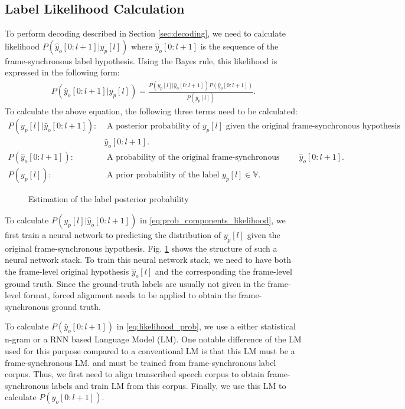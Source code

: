 \documentclass{article}
\begin{document}
\subsection{Label Likelihood Calculation}
To perform decoding described in Section \ref{sec:decoding}, 
we need to calculate likelihood $P(\hat{y}_o[0:l+1] | y_p[l])$
where $\hat{y}_o[0:l+1]$ is the sequence of the frame-synchronous 
label hypothesis.
Using the Bayes rule, this likelihood is expressed in the following form:
\begin{align}
  P(\hat{y}_o[0:l+1] \big| y_p[l]) 
    = \frac{P(y_p[l] \big| \hat{y}_o[0:l+1])
        P\left(\hat{y}_o[0:l+1] \right)}{P(y_p[l])}.
  \label{eq:likelihood_prob}
\end{align}
To calculate the above equation, the following three terms need to be
calculated:
\begin{align}
  P(y_p[l] \big| \hat{y}_o[0:l+1]): & \text{ A posterior probability of } y_p[l]
    \text{ given the original frame-synchronous hypothesis } \nonumber \\ 
    & \hat{y}_o[0:l+1].
    \nonumber \\
  P\left(\hat{y}_o[0:l+1] \right): & 
    \text{ A probability of the original frame-synchronous hypothesis } \hat{y}_o[0:l+1].
      \nonumber \\
  P(y_p[l]): & \text{ A prior probability of the label } y_p[l] \in \mathbb{V}.
  \label{eq:prob_components_likelihood}
\end{align}
%
\begin{figure}
    \centering
    \resizebox{40mm}{!}{
      
    } 
    \caption {
      Estimation of the label posterior probability
      \label{fig:label_posterior_prob_estimation}
    }
\end{figure}
%
To calculate $P(y_p[l] \big| \hat{y}_o[0:l+1])$ in
\eqref{eq:prob_components_likelihood}, we first train a neural network
to predicting the distribution of $y_p[l]$ given the original 
frame-synchronous hypothesis. Fig. \ref{fig:label_posterior_prob_estimation}
shows the structure of such a neural network stack. To train this
neural network stack, we need to have both the frame-level 
original hypothesis $\hat{y}_o[l]$ and the corresponding the frame-level
ground truth. Since the ground-truth labels are usually not given in the
frame-level format, forced alignment needs to be applied to obtain
the frame-synchronous ground truth.

To calculate $P\left(\hat{y}_o[0:l+1] \right)$ in \eqref{eq:likelihood_prob}, 
we use a either statistical n-gram or a RNN based Language Model (LM). 
One notable difference of the LM used for this purpose compared 
to a conventional LM is that this LM must be a frame-synchronous LM.
and must be trained from frame-synchronous label corpus. 
Thus, we first need to align transcribed speech corpus to obtain frame-synchronous 
labels and train LM from this corpus. 
Finally, we use this LM to calculate $P\left(\hat{y}_o[0:l+1] \right)$.
\end{document}

